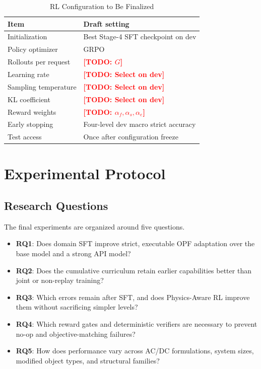 \documentclass[lettersize,journal]{IEEEtran}
\newcommand{\drafttodo}[1]{\textcolor{red}{\textbf{[TODO: #1]}}}
\begin{document}
\begin{table}[!t]
\caption{RL Configuration to Be Finalized}
\label{tab:rl-config}
\centering
\footnotesize
\begin{tabular}{@{}ll@{}}
\toprule
Item & Draft setting \\
\midrule
Initialization & Best Stage-4 SFT checkpoint on dev \\
Policy optimizer & GRPO \\
Rollouts per request & \drafttodo{$G$} \\
Learning rate & \drafttodo{Select on dev} \\
Sampling temperature & \drafttodo{Select on dev} \\
KL coefficient & \drafttodo{Select on dev} \\
Reward weights & \drafttodo{$\alpha_f,\alpha_s,\alpha_e$} \\
Early stopping & Four-level dev macro strict accuracy \\
Test access & Once after configuration freeze \\
\bottomrule
\end{tabular}
\end{table}

\section{Experimental Protocol}
\subsection{Research Questions}
The final experiments are organized around five questions.
\begin{itemize}
  \item \textbf{RQ1}: Does domain SFT improve strict, executable OPF adaptation over the base model and a strong API model?
  \item \textbf{RQ2}: Does the cumulative curriculum retain earlier capabilities better than joint or non-replay training?
  \item \textbf{RQ3}: Which errors remain after SFT, and does Physics-Aware RL improve them without sacrificing simpler levels?
  \item \textbf{RQ4}: Which reward gates and deterministic verifiers are necessary to prevent no-op and objective-matching failures?
  \item \textbf{RQ5}: How does performance vary across AC/DC formulations, system sizes, modified object types, and structural families?
\end{itemize}
\end{document}
